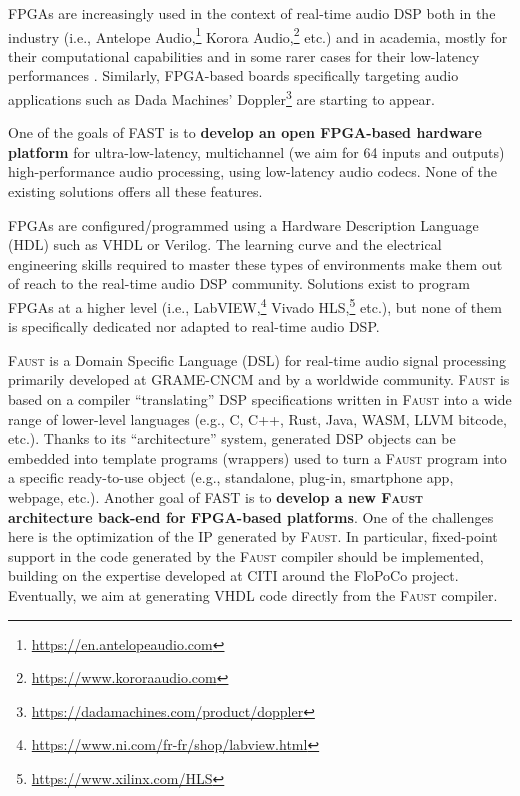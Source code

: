 \documentclass[a4paper,10pt]{article}
\newcommand{\F}{\textsc{Faust}}
\newcommand{\PP}{FAST}
\begin{document}
FPGAs are increasingly used in the context of real-time audio DSP both in the industry (i.e., Antelope Audio,\footnote{\url{https://en.antelopeaudio.com}} Korora Audio,\footnote{\url{https://www.kororaaudio.com}} etc.) and in academia, mostly for their computational capabilities \cite{Choi2013,Pfeifle2012} and in some rarer cases for their low-latency performances \cite{Verstraelen2014}. Similarly, FPGA-based boards specifically targeting audio applications such as Dada Machines' Doppler\footnote{\url{https://dadamachines.com/product/doppler}} are starting to appear. 

One of the goals of \PP{} is to \textbf{develop an open FPGA-based hardware platform} for ultra-low-latency, multichannel (we aim for 64 inputs and outputs) high-performance audio processing, using low-latency audio codecs.
None of the existing solutions offers all these features.



FPGAs are configured/programmed using a Hardware Description Language (HDL) such as VHDL or Verilog. The learning curve and the electrical engineering skills required to master these types of environments make them out of reach to the real-time audio DSP community. Solutions exist to program FPGAs at a higher level (i.e., LabVIEW,\footnote{\url{https://www.ni.com/fr-fr/shop/labview.html}} Vivado HLS,\footnote{\url{https://www.xilinx.com/HLS}} etc.), but none of them is specifically dedicated nor adapted to real-time audio DSP. 

\F{} \cite{Orlarey2009} is a Domain Specific Language (DSL) for real-time audio signal processing primarily developed at GRAME-CNCM and by a worldwide community. \F{} is based on a compiler ``translating'' DSP specifications written in \F{} into a wide range of lower-level languages (e.g., C, C++, Rust, Java, WASM, LLVM bitcode, etc.). Thanks to its ``architecture'' system, generated DSP objects can be embedded into template programs (wrappers) used to turn a \F{} program into a specific ready-to-use object (e.g., standalone, plug-in, smartphone app, webpage, etc.). Another goal of \PP{} is to \textbf{develop a new \F{} architecture back-end for FPGA-based platforms}.
One of the challenges here is the  optimization of the IP generated by \F{}. In particular, fixed-point support in the code generated by the \F{} compiler should be implemented, building on the expertise developed at CITI around the FloPoCo project. Eventually, we aim at generating VHDL code directly from the \F{} compiler. 
\end{document}
